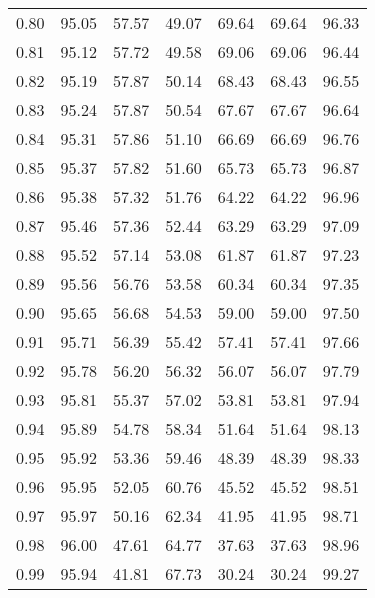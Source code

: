 \begin{tabular}{|c|c|c|c|c|c|c|}
      0.80 &     95.05 &     57.57 &      49.07 &   69.64 &      69.64 &         96.33 \\
      0.81 &     95.12 &     57.72 &      49.58 &   69.06 &      69.06 &         96.44 \\
      0.82 &     95.19 &     57.87 &      50.14 &   68.43 &      68.43 &         96.55 \\
      0.83 &     95.24 &     57.87 &      50.54 &   67.67 &      67.67 &         96.64 \\
      0.84 &     95.31 &     57.86 &      51.10 &   66.69 &      66.69 &         96.76 \\
      0.85 &     95.37 &     57.82 &      51.60 &   65.73 &      65.73 &         96.87 \\
      0.86 &     95.38 &     57.32 &      51.76 &   64.22 &      64.22 &         96.96 \\
      0.87 &     95.46 &     57.36 &      52.44 &   63.29 &      63.29 &         97.09 \\
      0.88 &     95.52 &     57.14 &      53.08 &   61.87 &      61.87 &         97.23 \\
      0.89 &     95.56 &     56.76 &      53.58 &   60.34 &      60.34 &         97.35 \\
      0.90 &     95.65 &     56.68 &      54.53 &   59.00 &      59.00 &         97.50 \\
      0.91 &     95.71 &     56.39 &      55.42 &   57.41 &      57.41 &         97.66 \\
      0.92 &     95.78 &     56.20 &      56.32 &   56.07 &      56.07 &         97.79 \\
      0.93 &     95.81 &     55.37 &      57.02 &   53.81 &      53.81 &         97.94 \\
      0.94 &     95.89 &     54.78 &      58.34 &   51.64 &      51.64 &         98.13 \\
      0.95 &     95.92 &     53.36 &      59.46 &   48.39 &      48.39 &         98.33 \\
      0.96 &     95.95 &     52.05 &      60.76 &   45.52 &      45.52 &         98.51 \\
      0.97 &     95.97 &     50.16 &      62.34 &   41.95 &      41.95 &         98.71 \\
      0.98 &     96.00 &     47.61 &      64.77 &   37.63 &      37.63 &         98.96 \\
      0.99 &     95.94 &     41.81 &      67.73 &   30.24 &      30.24 &         99.27 \\
\bottomrule
\end{tabular}

